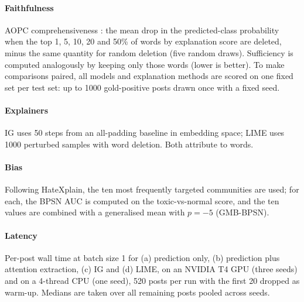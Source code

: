 \documentclass[preprint,12pt,authoryear]{elsarticle}
\begin{document}
\paragraph{Faithfulness} AOPC comprehensiveness \citep{deyoung2020eraser}: the mean drop in the predicted-class probability when the top 1, 5, 10, 20 and 50\% of words by explanation score are deleted, minus the same quantity for random deletion (five random draws). Sufficiency is computed analogously by keeping only those words (lower is better). To make comparisons paired, all models and explanation methods are scored on one fixed set per test set: up to \num{1000} gold-positive posts drawn once with a fixed seed.

\paragraph{Explainers} IG uses 50 steps from an all-padding baseline in embedding space; LIME uses \num{1000} perturbed samples with word deletion. Both attribute to words.

\paragraph{Bias} Following HateXplain, the ten most frequently targeted communities are used; for each, the BPSN AUC is computed on the toxic-vs-normal score, and the ten values are combined with a generalised mean with $p=-5$ (GMB-BPSN).

\paragraph{Latency} Per-post wall time at batch size 1 for (a) prediction only, (b) prediction plus attention extraction, (c) IG and (d) LIME, on an NVIDIA T4 GPU (three seeds) and on a 4-thread CPU (one seed), 520 posts per run with the first 20 dropped as warm-up. Medians are taken over all remaining posts pooled across seeds.
\end{document}
